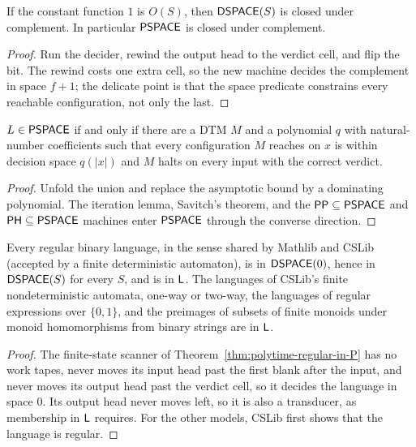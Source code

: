 \begin{lemma}
  \label{lem:space-compl}
  \leanok
  If the constant function $1$ is $O(S)$, then $\mathsf{DSPACE}(S)$ is closed under
  complement. In particular $\mathsf{PSPACE}$ is closed under complement.
\end{lemma}
\begin{proof}
  \leanok
  Run the decider, rewind the output head to the verdict cell, and flip the
  bit. The rewind costs one extra cell, so the new machine decides the
  complement in space $f + 1$; the delicate point is that the space predicate
  constrains every reachable configuration, not only the last.
\end{proof}

\begin{lemma}
  \label{lem:space-poly-window}
  \leanok
  $L \in \mathsf{PSPACE}$ if and only if there are a DTM $M$ and a polynomial $q$
  with natural-number coefficients such that every configuration $M$ reaches
  on $x$ is within decision space $q(|x|)$ and $M$ halts on every input with
  the correct verdict.
\end{lemma}
\begin{proof}
  \leanok
  Unfold the union and replace the asymptotic bound by a dominating polynomial.
  The iteration lemma, Savitch's theorem, and the
  $\mathsf{PP} \subseteq \mathsf{PSPACE}$ and $\mathsf{PH} \subseteq \mathsf{PSPACE}$ machines
  enter $\mathsf{PSPACE}$ through the converse direction.
\end{proof}

\begin{theorem}
  \label{thm:space-regular-in-L}
  \leanok
  Every regular binary language, in the sense shared by Mathlib and CSLib
  (accepted by a finite deterministic automaton), is in $\mathsf{DSPACE}(0)$, hence
  in $\mathsf{DSPACE}(S)$ for every $S$, and is in $\mathsf{L}$. The languages of
  CSLib's finite nondeterministic automata, one-way or two-way, the languages
  of regular expressions over $\{0,1\}$, and the preimages of subsets of
  finite monoids under monoid homomorphisms from binary strings are in
  $\mathsf{L}$.
\end{theorem}
\begin{proof}
  \leanok
  The finite-state scanner of Theorem~\ref{thm:polytime-regular-in-P} has no
  work tapes, never moves its input head past the first blank after the input,
  and never moves its output head past the verdict cell, so it decides the
  language in space $0$. Its output head never moves left, so it is also a
  transducer, as membership in $\mathsf{L}$ requires. For the other models, CSLib
  first shows that the language is regular.
\end{proof}

